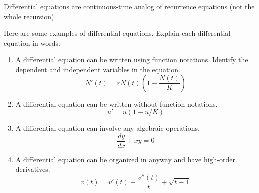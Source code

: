 \documentclass[../main.tex]{subfiles}
\begin{document}
\faStar{} Differential equations are continuous-time analog of recurrence equations (not the whole recursion).  

\begin{example}
  Here are some examples of differential equations.  Explain each differential equation in words.

  \begin{enumerate}[wide]
    \item A differential equation can be written using function notations. Identify the dependent and independent variables in the equation.
      \begin{equation}
        N'(t) = r N(t) \left(1-\frac{N(t)}{K}\right)
      \end{equation}

    \item A differential equation can be written without function notations.
      \begin{equation}
        u' = u (1-u/K)
      \end{equation}

    \item A differential equation can involve any algebraic operations.
      \begin{equation}
        \frac{dy}{dx} + xy = 0
      \end{equation}

    \item A differential equation can be organized in anyway and have high-order derivatives.
      \begin{equation}
        v(t) = v'(t) + \frac{v''(t)}{t} + \sqrt{t-1}
      \end{equation}
  \end{enumerate}
\end{example}
\end{document}
